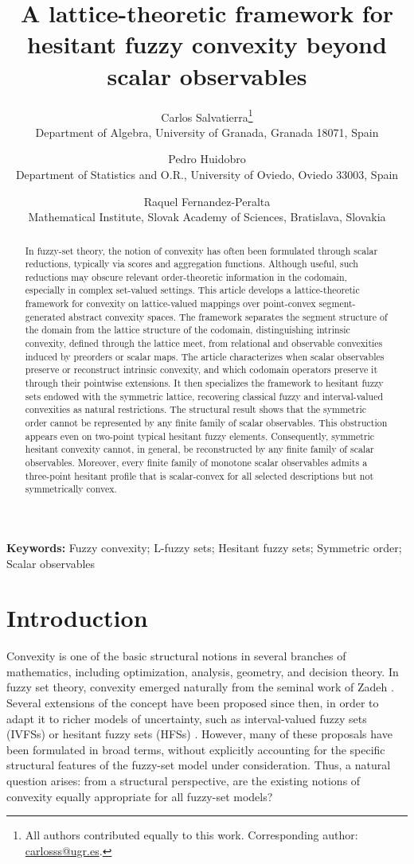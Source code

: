 \documentclass[11pt,a4paper]{article}
\title{A lattice-theoretic framework for hesitant fuzzy convexity beyond scalar observables}
\author{
Carlos Salvatierra\thanks{All authors contributed equally to this work. Corresponding author: \href{mailto:carlosss@ugr.es}{carlosss@ugr.es}.}\\
Department of Algebra, University of Granada, Granada 18071, Spain
\and
Pedro Huidobro\\
Department of Statistics and O.R., University of Oviedo, Oviedo 33003, Spain
\and
Raquel Fernandez-Peralta\\
Mathematical Institute, Slovak Academy of Sciences, Bratislava, Slovakia
}
\date{}
\begin{document}
\maketitle

\begin{abstract}
In fuzzy-set theory, the notion of convexity has often been formulated through scalar reductions, typically via scores and aggregation functions. Although useful, such reductions may obscure relevant order-theoretic information in the codomain, especially in complex set-valued settings. This article develops a lattice-theoretic framework for convexity on lattice-valued mappings over point-convex segment-generated abstract convexity spaces. The framework separates the segment structure of the domain from the lattice structure of the codomain, distinguishing intrinsic convexity, defined through the lattice meet, from relational and observable convexities induced by preorders or scalar maps. The article characterizes when scalar observables preserve or reconstruct intrinsic convexity, and which codomain operators preserve it through their pointwise extensions. It then specializes the framework to hesitant fuzzy sets endowed with the symmetric lattice, recovering classical fuzzy and interval-valued convexities as natural restrictions. The structural result shows that the symmetric order cannot be represented by any finite family of scalar observables. This obstruction appears even on two-point typical hesitant fuzzy elements. Consequently, symmetric hesitant convexity cannot, in general, be reconstructed by any finite family of scalar observables. Moreover, every finite family of monotone scalar observables admits a three-point hesitant profile that is scalar-convex for all selected descriptions but not symmetrically convex.

\end{abstract}

\noindent\textbf{Keywords:} Fuzzy convexity; L-fuzzy sets; Hesitant fuzzy sets; Symmetric order; Scalar observables

\section{Introduction}



Convexity is one of the basic structural notions in several branches of mathematics, including optimization, analysis, geometry, and decision theory. In fuzzy set theory, convexity emerged naturally from the seminal work of Zadeh \citep{Zadeh1965}. Several extensions of the concept have been proposed since then, in order to adapt it to richer models of uncertainty, such as interval-valued fuzzy sets (IVFSs) \citep{Sambuc75} or hesitant fuzzy sets (HFSs) \citep{Torra2010}. However, many of these proposals have been formulated in broad terms, without explicitly accounting for the specific structural features of the fuzzy-set model under consideration. Thus, a natural question arises: from a structural perspective, are the existing notions of convexity equally appropriate for all fuzzy-set models?
\end{document}
